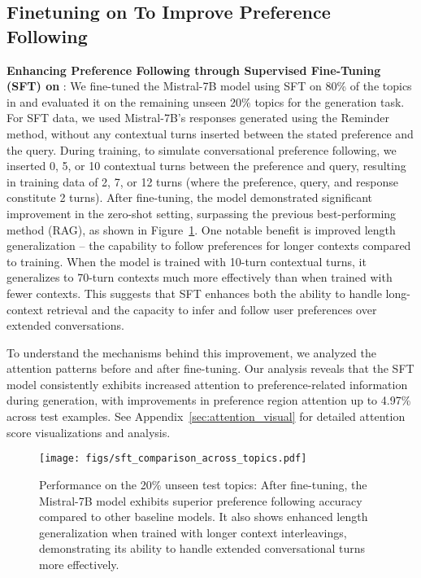 \subsection{Finetuning on \ours{} To Improve Preference Following}
\label{sec:finetune}
\textbf{Enhancing Preference Following through Supervised Fine-Tuning (SFT) on \ours{}}: We fine-tuned the Mistral-7B model using SFT on 80\% of the topics in \ours{} and evaluated it on the remaining unseen 20\% topics for the generation task. For SFT data, we used Mistral-7B's responses generated using the Reminder method, without any contextual turns inserted between the stated preference and the query. During training, to simulate conversational preference following, we inserted 0, 5, or 10 contextual turns between the preference and query, resulting in training data of 2, 7, or 12 turns (where the preference, query, and response constitute 2 turns). After fine-tuning, the model demonstrated significant improvement in the zero-shot setting, surpassing the previous best-performing method (RAG), as shown in Figure~\ref{fig:sft}. One notable benefit is improved length generalization -- the capability to follow preferences for longer contexts compared to training. When the model is trained with 10-turn contextual turns, it generalizes to 70-turn contexts much more effectively than when trained with fewer contexts. This suggests that SFT enhances both the ability to handle long-context retrieval and the capacity to infer and follow user preferences over extended conversations.

To understand the mechanisms behind this improvement, we analyzed the attention patterns before and after fine-tuning. Our analysis reveals that the SFT model consistently exhibits increased attention to preference-related information during generation, with improvements in preference region attention up to 4.97\% across test examples. See Appendix~\ref{sec:attention_visual} for detailed attention score visualizations and analysis.
\begin{figure}[h]
\hspace{-0.2em}
    \centering
    \begin{minipage}{0.65\textwidth}
    \vspace{-0.15em}
         \texttt{[image: figs/sft\_comparison\_across\_topics.pdf]}
    \end{minipage}
   \begin{minipage}{0.28\textwidth}
\caption{Performance on the 20\% unseen test topics: After fine-tuning, the Mistral-7B model exhibits superior preference following accuracy compared to other baseline models. It also shows enhanced length generalization when trained with longer context interleavings, demonstrating its ability to handle extended conversational turns more effectively.}
    \label{fig:sft}       
   \end{minipage}

\end{figure}

